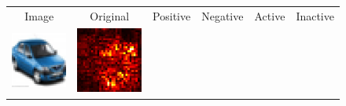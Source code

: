 \documentclass[preprint,12pt]{elsarticle}
\begin{document}
\begin{figure}[ht]
  \centering
  \footnotesize
  \newcommand{\scale}{0.35}
  \setlength{\tabcolsep}{2pt}
  \begin{tabular}{cccccc}
  Image & Original & Positive & Negative & Active & Inactive \\
  
  \includegraphics[scale=\scale]{../visualizations/examples/cifar10/cnn/images/1.png} &
  \includegraphics[scale=\scale]{../visualizations/examples/cifar10/cnn/saliency_map/1.png} & 

\end{tabular}
\end{figure}
\end{document}
